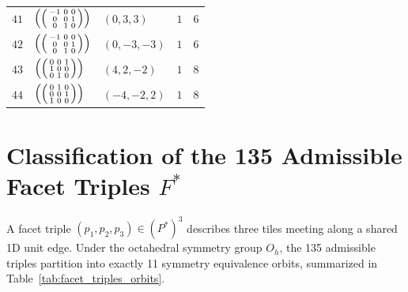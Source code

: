 \documentclass[11pt,a4paper]{article}
\theoremstyle{definition}
\begin{document}
\begin{longtable}{p{1.2cm}p{3.0cm}p{2.6cm}cc}
$41$ & $\left(\begin{psmallmatrix} -1 & 0 & 0 \\ 0 & 0 & 1 \\ 0 & 1 & 0 \end{psmallmatrix}\right)$ & $(0, 3, 3)$ & $1$ & $6$ \\
$42$ & $\left(\begin{psmallmatrix} -1 & 0 & 0 \\ 0 & 0 & 1 \\ 0 & 1 & 0 \end{psmallmatrix}\right)$ & $(0, -3, -3)$ & $1$ & $6$ \\
$43$ & $\left(\begin{psmallmatrix} 0 & 0 & 1 \\ 1 & 0 & 0 \\ 0 & 1 & 0 \end{psmallmatrix}\right)$ & $(4, 2, -2)$ & $1$ & $8$ \\
$44$ & $\left(\begin{psmallmatrix} 0 & 1 & 0 \\ 0 & 0 & 1 \\ 1 & 0 & 0 \end{psmallmatrix}\right)$ & $(-4, -2, 2)$ & $1$ & $8$ \\
\bottomrule
\end{longtable}

\section{Classification of the 135 Admissible Facet Triples $F^*$}
\label{app:facet_triples}

A facet triple $(p_1, p_2, p_3) \in (P^*)^3$ describes three tiles meeting along a shared 1D unit edge. Under the octahedral symmetry group $O_h$, the 135 admissible triples partition into exactly 11 symmetry equivalence orbits, summarized in Table~\ref{tab:facet_triples_orbits}.
\end{document}

